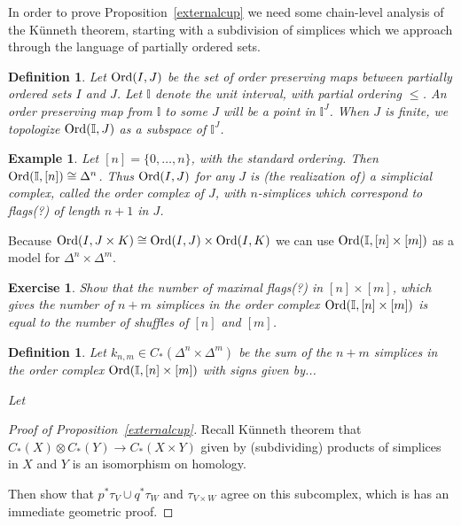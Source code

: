 \documentclass{amsart}          %
\newtheorem{definition}[theorem]{Definition}
\newtheorem{example}[theorem]{Example}
\newtheorem{exercise}[theorem]{Exercise}
\newcommand{\I}{\mathbb I}
\begin{document}
In order to prove Proposition~\ref{externalcup} we need some chain-level analysis of the K\"unneth theorem, starting with 
a subdivision of simplices which we approach through the language of partially ordered sets.

\begin{definition}
Let ${\rm Ord}(I,J)$ be the set of order preserving maps between partially ordered sets $I$ and $J$.  Let $\I$ denote the unit interval,
with partial ordering $\leq$.  An order preserving map from $\I$ to some $J$ will be a point in  $\I^J$.  When $J$ is finite, we topologize
${\rm Ord}(\I, J)$ as a subspace of $\I^J$.
\end{definition}

\begin{example}
Let $[n] = \{0, \ldots, n\}$, with the standard ordering.  Then ${\rm Ord}(\I, [n]) \cong \Delta^n$.  Thus  ${\rm Ord}(I,J)$ for any $J$
is (the realization of) a simplicial complex, called the order complex of $J$, with $n$-simplices which correspond to flags(?)
of length $n + 1$ in $J$.
\end{example}

Because ${\rm Ord}(I,J \times K) \cong {\rm Ord}(I,J) \times {\rm Ord}(I,K)$ we can use ${\rm Ord}(\I,[n] \times [m])$
as a model for $\Delta^n \times \Delta^m$.   

\begin{exercise}
Show that the number of maximal flags(?) in $[n] \times [m]$, which gives the number of
$n + m$ simplices in the order complex ${\rm Ord}(\I, [n] \times [m])$ is equal to the number of shuffles of $[n]$ and $[m]$.
\end{exercise}

\begin{definition}
Let $k_{n,m} \in C_*(\Delta^n \times \Delta^m)$ be the sum of the $n + m$ simplices in the order complex ${\rm Ord}(\I, [n] \times [m])$
with signs given by...  

Let 
\end{definition}


\begin{proof}[Proof of Proposition~\ref{externalcup}]
Recall K\"unneth theorem that  $C_*(X) \otimes C_*(Y) \to C_*(X \times Y)$ given by (subdividing) products of simplices in $X$ and $Y$ is an
isomorphism on homology.  

Then show that $p^* \tau_V \cup q^* \tau_W$ and $\tau_{V \times W}$ agree on this subcomplex, which is has an immediate
geometric proof.
\end{proof}
\end{document}
